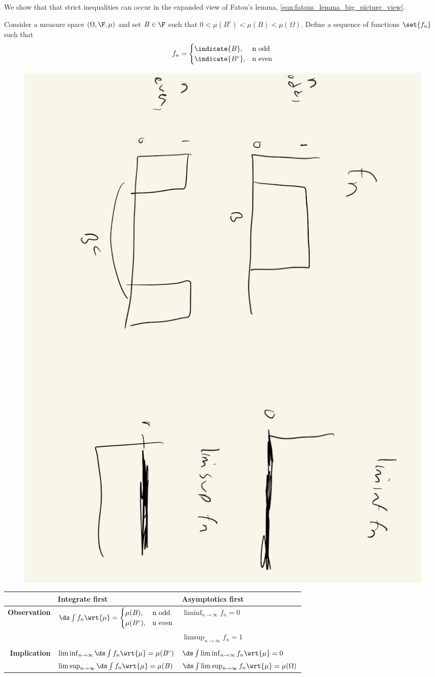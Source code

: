 \documentclass{article} %
\newcommand{\dint}{\ds\int}
\newcommand{\dmu}{\wrt{\mu}}
\begin{document}
\begin{example}{}
We show that that strict inequalities can occur in the expanded view of Fatou's lemma, \eqref{eqn:fatous_lemma_big_picture_view}.  

Consider a measure space $(\Omega, \F, \mu)$ and set $B \in \F$ such that $0 < \mu(B^c) < \mu(B) < \mu(\Omega)$. 
Define a sequence of functions $\set{f_n}$ such that
\[ f_n = 
\begin{cases}
\indicate{B}, & \text{n odd} \\ 
\indicate{B^c}, & \text{n even} \\ 	
 \end{cases}
 \]	
 
 \begin{figure}[H]
 \centering 
 \includegraphics[width=.4\textwidth, angle=90]{images/fatous_lemma_example}	
 \end{figure}

 \begin{table}[htp!]
 \begin{tabular}{rl|l}
 & \textbf{Integrate first} & \textbf{Asymptotics first} \\
 \hline 
\textbf{Observation} & $\dint f_n  \dmu = 
\begin{cases}
\mu(B), & \text{n odd} \\ 
\mu(B^c), & \text{n even} \\ 	
 \end{cases}$	 &  $\liminf_{n \to \infty} f_n =0$ \\
 & & $\limsup_{n \to \infty} f_n =1$\\
 & & \\
\textbf{Implication} & $\liminf_{n \to \infty} \dint f_n \dmu = \mu(B^c)$ & $\dint \liminf_{n \to \infty} f_n \dmu = 0$ \\
& $\limsup_{n \to \infty} \dint f_n \dmu = \mu(B)$ & $\dint \limsup_{n \to \infty} f_n \dmu = \mu(\Omega)$ \\
 \end{tabular}
 \end{table}


\end{example}
\end{document}
